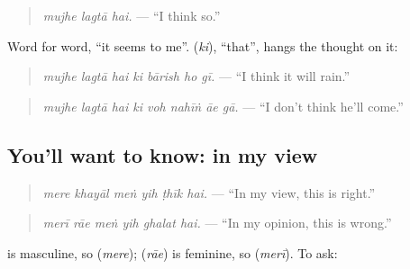\begin{quote}
\emph{mujhe lagtā hai.} — \textquotedblleft{}I think so.\textquotedblright{}
\end{quote}

Word for word, \textquotedblleft{}it seems to me\textquotedblright{}. \textbf{} (\emph{ki}), \textquotedblleft{}that\textquotedblright{}, hangs the thought on it:

\begin{quote}
\textbf{      }
\end{quote}

\begin{quote}
\emph{mujhe lagtā hai ki bārish ho gī.} — \textquotedblleft{}I think it will rain.\textquotedblright{}
\end{quote}

\begin{quote}
\textbf{       }
\end{quote}

\begin{quote}
\emph{mujhe lagtā hai ki voh nahīṅ āe gā.} — \textquotedblleft{}I don't think he'll come.\textquotedblright{}
\end{quote}

\subsection*{You'll want to know: in my view}
\begin{quote}
\textbf{     }
\end{quote}

\begin{quote}
\emph{mere khayāl meṅ yih ṭhīk hai.} — \textquotedblleft{}In my view, this is right.\textquotedblright{}
\end{quote}

\begin{quote}
\textbf{     }
\end{quote}

\begin{quote}
\emph{merī rāe meṅ yih ghalat hai.} — \textquotedblleft{}In my opinion, this is wrong.\textquotedblright{}
\end{quote}

\textbf{} is masculine, so \textbf{} (\emph{mere}); \textbf{} (\emph{rāe}) is feminine, so \textbf{} (\emph{merī}). To ask:

